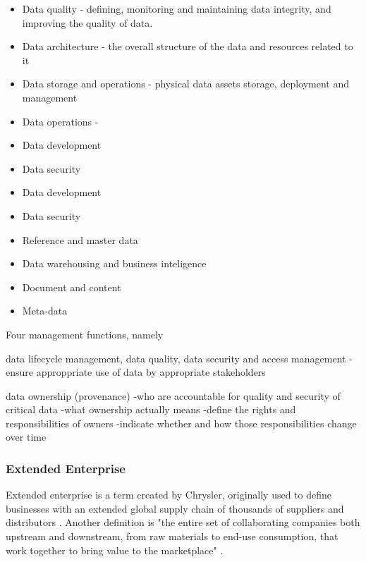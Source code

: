 \begin{itemize}
	\item Data quality - defining, monitoring and maintaining data integrity, and improving the quality of data.
	\item Data architecture - the overall structure of the data and resources related to it
	\item Data storage and operations - physical data assets storage, deployment and management
	\item Data operations -
	\item Data development
	\item Data security
	\item Data development
	\item Data security
	\item Reference and master data
	\item Data warehousing and business inteligence
	\item Document and content
	\item Meta-data    
\end{itemize}


Four management functions, namely 

data lifecycle management, 
data quality, 
data security and access management
-ensure approppriate use of data by appropriate stakeholders


data ownership (provenance)
-who are accountable for quality and security of critical data
-what ownership actually means
-define the rights and responsibilities of owners
-indicate whether and how those responsibilities change over time

\subsubsection{Extended Enterprise}
Extended enterprise is a term created by Chrysler, originally used to define businesses with an extended global supply chain of thousands of suppliers and distributors \cite{dyer2000collaborative}. Another definition is "the entire set of collaborating companies both upstream and downstream, from raw materials to end-use consumption, that work together to bring value to the marketplace" \cite{spekman2004risky}. 

